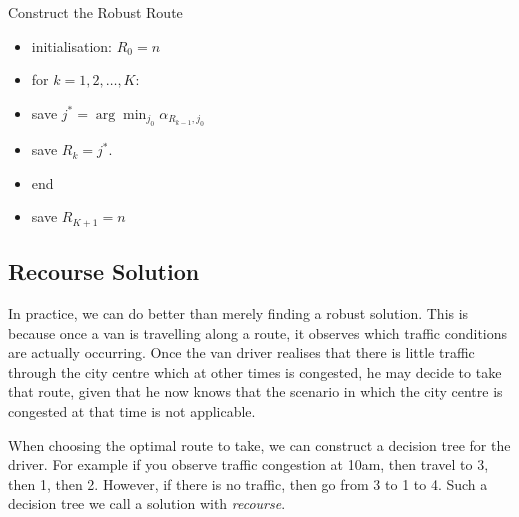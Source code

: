 \begin{algorithm}{Construct the Robust Route}{}
	\label{alg:forward_robust_solution}
	\begin{itemize}
		\item[] initialisation: $R_0 = n$
		\item[] for $k=1, 2, \ldots, K:$
		\item[] \quad save $j^* = \arg\min_{j_0}\alpha_{R_{k-1}, j_0} $
		\item[] \quad save $R_{k} = j^*$.
		\item[] end
		\item[] save $R_{K+1} = n$
	\end{itemize}
\end{algorithm}

\subsection{Recourse Solution}

In practice, we can do better than merely finding a robust solution. This is because once a van is travelling along a route, it observes which traffic conditions are actually occurring. Once the van driver realises that there is little traffic through the city centre which at other times is congested, he may decide to take that route, given that he now knows that the scenario in which the city centre is congested at that time is not applicable.

When choosing the optimal route to take, we can construct a decision tree for the driver. For example if you observe traffic congestion at 10am, then travel to 3, then 1, then 2. However, if there is no traffic, then go from 3 to 1 to 4. Such a decision tree we call a solution with \textit{recourse}.



